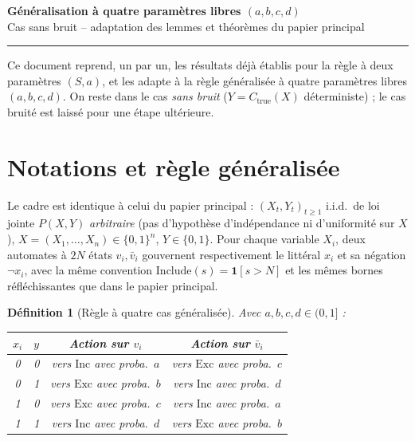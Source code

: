 \documentclass[12pt,a4paper]{article}
\newtheorem{definition}[theorem]{Définition}
\theoremstyle{remark}
\newcommand{\Inc}{\ensuremath{\mathrm{Inc}}}
\newcommand{\Exc}{\ensuremath{\mathrm{Exc}}}
\newcommand{\vbar}{\bar{v}}
\begin{document}
\begin{center}
{\LARGE\bfseries Généralisation à quatre paramètres libres $(a,b,c,d)$}\\[4pt]
{\large Cas sans bruit -- adaptation des lemmes et théorèmes du papier principal}
\end{center}
\vspace{0.5em}
\hrule
\vspace{1.5em}

Ce document reprend, un par un, les résultats déjà établis  pour la règle à deux paramètres $(S,a)$, et les
adapte à la règle généralisée à quatre paramètres libres $(a,b,c,d)$. On reste dans le cas \emph{sans bruit} ($Y=C_{\mathrm{true}}(X)$
déterministe) ; le cas bruité est laissé pour une étape ultérieure.

\section{Notations et règle généralisée}

Le cadre est identique à celui du papier principal : $(X_t,Y_t)_{t\ge1}$
i.i.d.\ de loi jointe $P(X,Y)$ \emph{arbitraire} (pas d'hypothèse
d'indépendance ni d'uniformité sur $X$), $X=(X_1,\ldots,X_n)\in\{0,1\}^n$,
$Y\in\{0,1\}$. Pour chaque variable $X_i$, deux automates à $2N$ états
$v_i,\vbar_i$ gouvernent respectivement le littéral $x_i$ et sa négation
$\neg x_i$, avec la même convention $\mathrm{Include}(s)=\mathbf1[s>N]$ et les
mêmes bornes réfléchissantes que dans le papier principal.

\begin{definition}[Règle à quatre cas généralisée]\label{def:regle}
Avec $a,b,c,d\in(0,1]$ :
\begin{center}
\begin{tabular}{cccc}
\toprule
$x_i$ & $y$ & Action sur $v_i$ & Action sur $\vbar_i$ \\
\midrule
0 & 0 & vers $\Inc$ avec proba.\ $a$ & vers $\Exc$ avec proba.\ $c$ \\
0 & 1 & vers $\Exc$ avec proba.\ $b$ & vers $\Inc$ avec proba.\ $d$ \\
1 & 0 & vers $\Exc$ avec proba.\ $c$ & vers $\Inc$ avec proba.\ $a$ \\
1 & 1 & vers $\Inc$ avec proba.\ $d$ & vers $\Exc$ avec proba.\ $b$ \\
\bottomrule
\end{tabular}
\end{center}
\end{definition}
\end{document}
